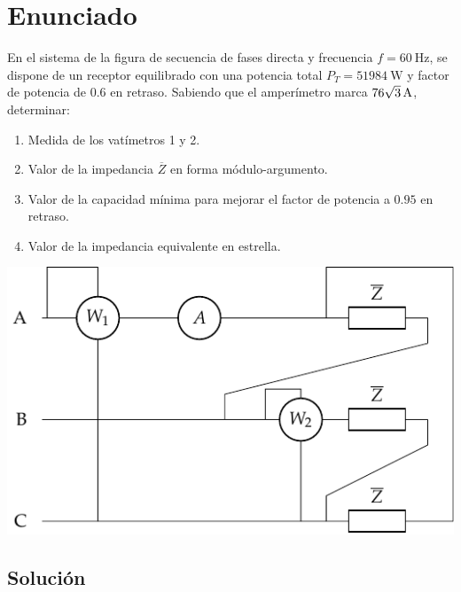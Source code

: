 \section{Enunciado}

En el sistema de la figura de secuencia de fases directa y frecuencia
$f=\qty{60}{\hertz}$, se dispone de un receptor equilibrado con una
potencia total $P_T=\qty{51984}{\watt}$ y factor de potencia de $0.6$ en
retraso. Sabiendo que el amperímetro marca
$\qty[parse-numbers=false]{76\sqrt{3}}{\ampere}$, determinar:
\begin{enumerate}
    \item Medida de los vatímetros 1 y 2.
    \item Valor de la impedancia $\overline{Z}$ en forma módulo-argumento.
    \item Valor de la capacidad mínima para mejorar el factor de potencia
    a $0.95$ en retraso.
    \item Valor de la impedancia equivalente en estrella.
\end{enumerate}

\begin{center}
    \includegraphics[width=.5\linewidth]{figuras/dosvat_triangulo.pdf}
\end{center}


\subsection*{Solución}


